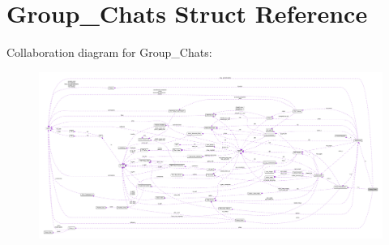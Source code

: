 \hypertarget{struct_group___chats}{\section{Group\+\_\+\+Chats Struct Reference}
\label{struct_group___chats}
}


Collaboration diagram for Group\+\_\+\+Chats\+:\nopagebreak
\begin{figure}[H]
\begin{center}
\leavevmode
\includegraphics[width=350pt]{struct_group___chats__coll__graph}
\end{center}
\end{figure}
